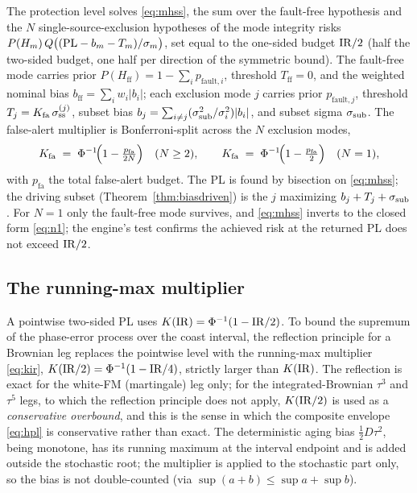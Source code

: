 The protection level solves \eqref{eq:mhss}, the sum over the fault-free
hypothesis and the $N$ single-source-exclusion hypotheses of the mode integrity
risks $P(H_m)\,Q\big((\mathrm{PL}-b_m-T_m)/\sigma_m\big)$, set equal to the one-sided
budget $\mathrm{IR}/2$ (half the two-sided budget, one half per direction of the symmetric
bound). The fault-free mode carries prior $P(H_{\mathrm{ff}})=1-\sum_i
p_{\mathrm{fault},i}$, threshold $T_{\mathrm{ff}}=0$, and the weighted nominal bias
$b_{\mathrm{ff}}=\sum_i w_i|b_i|$; each exclusion mode $j$ carries prior
$p_{\mathrm{fault},j}$, threshold $T_j=K_{\mathrm{fa}}\,\sigma_{\mathrm{ss}}^{(j)}$, subset
bias $b_j=\sum_{i\neq j}(\sigma_{\mathrm{sub}}^{2}/\sigma_i^{2})|b_i|$, and subset sigma
$\sigma_{\mathrm{sub}}$. The false-alert multiplier is Bonferroni-split across the $N$ exclusion
modes,
\begin{equation}
  K_{\mathrm{fa}} \;=\;
  \Phi^{-1}\!\Big(1-\tfrac{p_{\mathrm{fa}}}{2N}\Big)\quad(N\ge2),
  \qquad
  K_{\mathrm{fa}} \;=\; \Phi^{-1}\!\Big(1-\tfrac{p_{\mathrm{fa}}}{2}\Big)\quad(N=1),
\end{equation}
with $p_{\mathrm{fa}}$ the total false-alert budget. The PL is found by bisection
on \eqref{eq:mhss}; the driving subset (Theorem~\ref{thm:biasdriven}) is the $j$
maximizing $b_j+T_j+\sigma_{\mathrm{sub}}$. For $N=1$ only the fault-free mode survives, and
\eqref{eq:mhss} inverts to the closed form \eqref{eq:n1}; the engine's
 test confirms the achieved risk at the returned
PL does not exceed $\mathrm{IR}/2$.

\subsection{The running-max multiplier}
\label{app:kir}

A pointwise two-sided PL uses $K(\mathrm{IR})=\Phi^{-1}(1-\mathrm{IR}/2)$. To bound the supremum
of the phase-error process over the coast interval, the reflection principle for a
Brownian leg replaces the pointwise level with the running-max multiplier
\eqref{eq:kir}, $K(\mathrm{IR}/2)=\Phi^{-1}(1-\mathrm{IR}/4)$, strictly larger than $K(\mathrm{IR})$.
The reflection is exact for the white-FM (martingale) leg only; for the
integrated-Brownian $\tau^{3}$ and $\tau^{5}$ legs, to which the reflection
principle does not apply, $K(\mathrm{IR}/2)$ is used as a \emph{conservative overbound},
and this is the sense in which the composite envelope \eqref{eq:hpl} is
conservative rather than exact. The deterministic aging bias $\tfrac12 D\tau^{2}$,
being monotone, has its running maximum at the interval endpoint and is added
outside the stochastic root; the multiplier is applied to the stochastic part only,
so the bias is not double-counted (via $\sup(a+b)\le\sup a+\sup b$).

